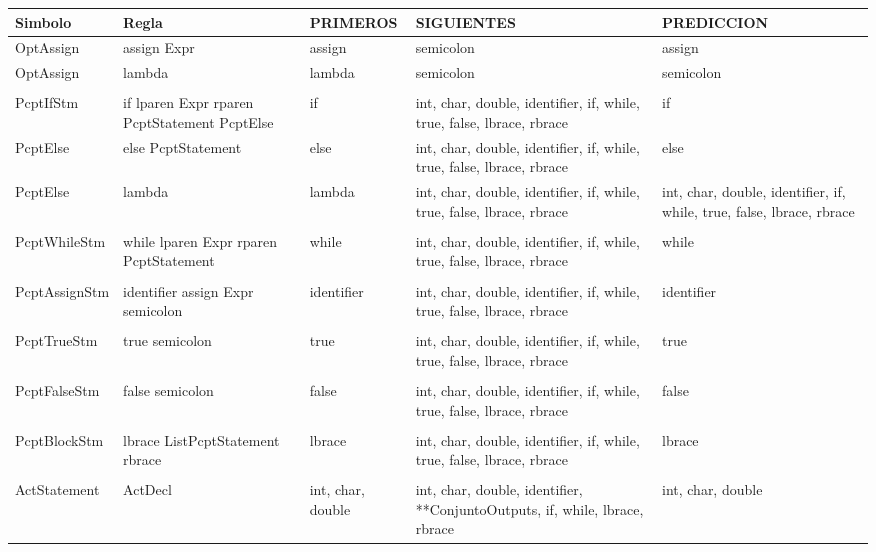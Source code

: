 
\begin{tabularx}{\textwidth}{BBBBB}
          \toprule
          Simbolo & Regla & PRIMEROS & SIGUIENTES & PREDICCION \\
          \midrule
OptAssign & assign Expr & assign & semicolon & assign \\
     OptAssign & lambda & lambda & semicolon & semicolon \\
           &       &       &       &  \\
     PcptIfStm & if lparen Expr rparen PcptStatement PcptElse & if    & int, char, double, identifier, if, while, true, false, lbrace, rbrace & if \\
     PcptElse & else PcptStatement & else  & int, char, double, identifier, if, while, true, false, lbrace, rbrace & else \\
     PcptElse & lambda & lambda & int, char, double, identifier, if, while, true, false, lbrace, rbrace & int, char, double, identifier, if, while, true, false, lbrace, rbrace \\
           &       &       &       &  \\
     PcptWhileStm & while lparen Expr rparen PcptStatement & while & int, char, double, identifier, if, while, true, false, lbrace, rbrace & while \\
           &       &       &       &  \\
     PcptAssignStm & identifier assign Expr semicolon & identifier & int, char, double, identifier, if, while, true, false, lbrace, rbrace & identifier \\
           &       &       &       &  \\
     PcptTrueStm & true semicolon & true  & int, char, double, identifier, if, while, true, false, lbrace, rbrace & true \\
           &       &       &       &  \\
     PcptFalseStm & false semicolon & false & int, char, double, identifier, if, while, true, false, lbrace, rbrace & false \\
           &       &       &       &  \\
     PcptBlockStm & lbrace ListPcptStatement rbrace & lbrace & int, char, double, identifier, if, while, true, false, lbrace, rbrace & lbrace \\
           &       &       &       &  \\
     ActStatement & ActDecl & int, char, double & int, char, double, identifier, **ConjuntoOutputs, if, while, lbrace, rbrace & int, char, double \\

 \bottomrule
     \end{tabularx}%

